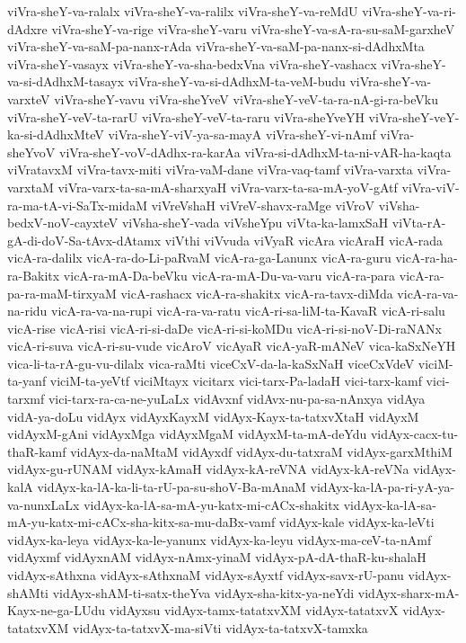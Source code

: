 {viVra-sheY-va-ralalx
viVra-sheY-va-ralilx
viVra-sheY-va-reMdU
viVra-sheY-va-ri-dAdxre
viVra-sheY-va-rige
viVra-sheY-varu
viVra-sheY-va-sA-ra-su-saM-garxheV
viVra-sheY-va-saM-pa-nanx-rAda
viVra-sheY-va-saM-pa-nanx-si-dAdhxMta
viVra-sheY-vasayx
viVra-sheY-va-sha-bedxVna
viVra-sheY-vashacx
viVra-sheY-va-si-dAdhxM-tasayx
viVra-sheY-va-si-dAdhxM-ta-veM-budu
viVra-sheY-va-varxteV
viVra-sheY-vavu
viVra-sheYveV
viVra-sheY-veV-ta-ra-nA-gi-ra-beVku
viVra-sheY-veV-ta-rarU
viVra-sheY-veV-ta-raru
viVra-sheYveYH
viVra-sheY-veY-ka-si-dAdhxMteV
viVra-sheY-viV-ya-sa-mayA
viVra-sheY-vi-nAmf
viVra-sheYvoV
viVra-sheY-voV-dAdhx-ra-karAa
viVra-si-dAdhxM-ta-ni-vAR-ha-kaqta
viVratavxM
viVra-tavx-miti
viVra-vaM-dane
viVra-vaq-tamf
viVra-varxta
viVra-varxtaM
viVra-varx-ta-sa-mA-sharxyaH
viVra-varx-ta-sa-mA-yoV-gAtf
viVra-viV-ra-ma-tA-vi-SaTx-midaM
viVreVshaH
viVreV-shavx-raMge
viVroV
viVsha-bedxV-noV-cayxteV
viVsha-sheY-vada
viVsheYpu
viVta-ka-lamxSaH
viVta-rA-gA-di-doV-Sa-tAvx-dAtamx
viVthi
viVvuda
viVyaR
vicAra
vicAraH
vicA-rada
vicA-ra-dalilx
vicA-ra-do-Li-paRvaM
vicA-ra-ga-Lanunx
vicA-ra-guru
vicA-ra-ha-ra-Bakitx
vicA-ra-mA-Da-beVku
vicA-ra-mA-Du-va-varu
vicA-ra-para
vicA-ra-pa-ra-maM-tirxyaM
vicA-rashacx
vicA-ra-shakitx
vicA-ra-tavx-diMda
vicA-ra-va-na-ridu
vicA-ra-va-na-rupi
vicA-ra-va-ratu
vicA-ri-sa-liM-ta-KavaR
vicA-ri-salu
vicA-rise
vicA-risi
vicA-ri-si-daDe
vicA-ri-si-koMDu
vicA-ri-si-noV-Di-raNANx
vicA-ri-suva
vicA-ri-su-vude
vicAroV
vicAyaR
vicA-yaR-mANeV
vica-kaSxNeYH
vica-li-ta-rA-gu-vu-dilalx
vica-raMti
viceCxV-da-la-kaSxNaH
viceCxVdeV
viciM-ta-yanf
viciM-ta-yeVtf
viciMtayx
vicitarx
vici-tarx-Pa-ladaH
vici-tarx-kamf
vici-tarxmf
vici-tarx-ra-ca-ne-yuLaLx
vidAvxnf
vidAvx-nu-pa-sa-nAnxya
vidAya
vidA-ya-doLu
vidAyx
vidAyxKayxM
vidAyx-Kayx-ta-tatxvXtaH
vidAyxM
vidAyxM-gAni
vidAyxMga
vidAyxMgaM
vidAyxM-ta-mA-deYdu
vidAyx-cacx-tu-thaR-kamf
vidAyx-da-naMtaM
vidAyxdf
vidAyx-du-tatxraM
vidAyx-garxMthiM
vidAyx-gu-rUNAM
vidAyx-kAmaH
vidAyx-kA-reVNA
vidAyx-kA-reVNa
vidAyx-kalA
vidAyx-ka-lA-ka-li-ta-rU-pa-su-shoV-Ba-mAnaM
vidAyx-ka-lA-pa-ri-yA-ya-va-nunxLaLx
vidAyx-ka-lA-sa-mA-yu-katx-mi-cACx-shakitx
vidAyx-ka-lA-sa-mA-yu-katx-mi-cACx-sha-kitx-sa-mu-daBx-vamf
vidAyx-kale
vidAyx-ka-leVti
vidAyx-ka-leya
vidAyx-ka-le-yanunx
vidAyx-ka-leyu
vidAyx-ma-ceV-ta-nAmf
vidAyxmf
vidAyxnAM
vidAyx-nAmx-yinaM
vidAyx-pA-dA-thaR-ku-shalaH
vidAyx-sAthxna
vidAyx-sAthxnaM
vidAyx-sAyxtf
vidAyx-savx-rU-panu
vidAyx-shAMti
vidAyx-shAM-ti-satx-theYva
vidAyx-sha-kitx-ya-neYdi
vidAyx-sharx-mA-Kayx-ne-ga-LUdu
vidAyxsu
vidAyx-tamx-tatatxvXM
vidAyx-tatatxvX
vidAyx-tatatxvXM
vidAyx-ta-tatxvX-ma-siVti
vidAyx-ta-tatxvX-tamxka
}
